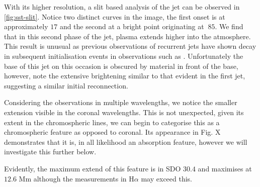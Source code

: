 \documentclass{emulateapj}
\begin{document}
With its higher resolution, a slit based analysis of the jet can be observed in \cref{fig:sst-slit}.
Notice two distinct curves in the image, the first onset is at approximately $17$ and the second at a bright point originating at $~85$.
We find that in this second phase of the jet, plasma extends higher into the atmosphere.
This result is unusual as previous observations of recurrent jets have shown decay in subsequent initialisation events in observations such as \cite{Jiang2007}.
Unfortunately the base of this jet on this occasion is obscured by material in front of the base, however, note the extensive brightening similar to that evident in the first jet, suggesting a similar initial reconnection.

Considering the observations in multiple wavelengths, we notice the smaller extension visible in the coronal wavelengths.
This is not unexpected, given its extent in the chromospheric lines, we can begin to categorise this as a chromospheric feature as opposed to coronal.
Its appearance in Fig. X demonstrates that it is, in all likelihood an absorption feature, however we will investigate this further below.

Evidently, the maximum extend of this feature is in SDO $30.4$ and maximises at $12.6$ Mm although the measurements in H$\alpha$ may exceed this.
\end{document}
